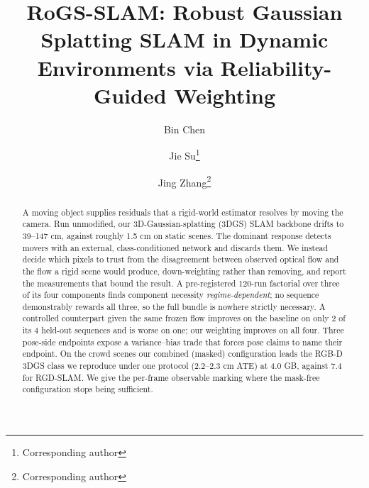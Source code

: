 \documentclass[a4paper]{llncs}
\begin{document}
\title{RoGS-SLAM: Robust Gaussian Splatting SLAM in Dynamic
Environments via Reliability-Guided Weighting}
\author{Bin Chen
\and
Jie Su\thanks{Corresponding author}
\and
Jing Zhang\thanks{Corresponding author}}

\maketitle

\begin{abstract}
A moving object supplies residuals that a rigid-world estimator resolves by moving the
camera. Run unmodified, our 3D-Gaussian-splatting (3DGS) SLAM backbone drifts to 39--147 cm,
against roughly 1.5 cm on static scenes. The dominant response detects movers with an
external, class-conditioned network and discards them. We instead decide which pixels to
trust from the disagreement between observed optical flow and the flow a rigid scene
would produce, down-weighting rather than removing, and report the measurements that
bound the result. A pre-registered 120-run factorial over three of its four components
finds component necessity \emph{regime-dependent}; no sequence demonstrably rewards all
three, so the full bundle is nowhere strictly necessary. A controlled counterpart given
the same frozen flow improves on the baseline on only 2 of its 4 held-out sequences and
is worse on one; our weighting improves on all four. Three pose-side endpoints expose a
variance--bias trade that forces pose claims to name their endpoint. On the crowd scenes
our combined (masked) configuration leads the RGB-D 3DGS class we reproduce under one
protocol (2.2--2.3 cm ATE) at 4.0 GB, against 7.4 for RGD-SLAM. We give the per-frame
observable marking where the mask-free configuration stops being sufficient.

\end{abstract}


\end{document}
